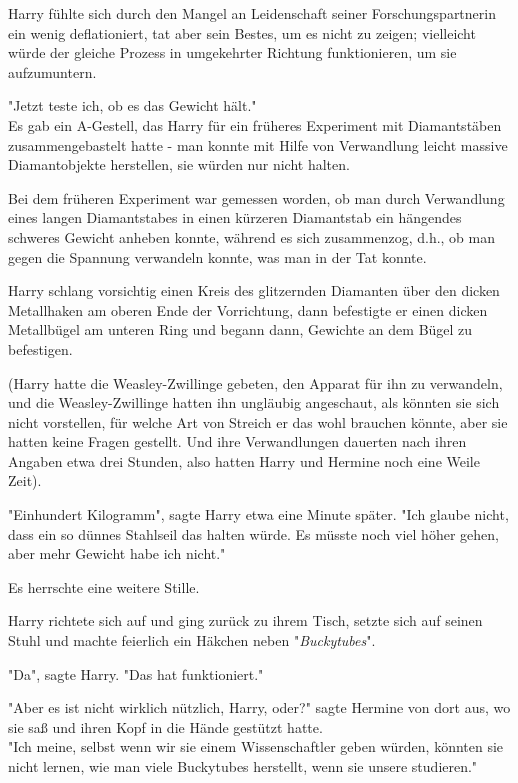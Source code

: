 {Harry fühlte sich durch den Mangel an Leidenschaft seiner Forschungspartnerin ein wenig deflationiert, tat aber sein Bestes, um es nicht zu zeigen; vielleicht würde der gleiche Prozess in umgekehrter Richtung funktionieren, um sie aufzumuntern.

"Jetzt teste ich, ob es das Gewicht hält."\\ Es gab ein A-Gestell, das Harry für ein früheres Experiment mit Diamantstäben zusammengebastelt hatte - man konnte mit Hilfe von Verwandlung leicht massive Diamantobjekte herstellen, sie würden nur nicht halten.

Bei dem früheren Experiment war gemessen worden, ob man durch Verwandlung eines langen Diamantstabes in einen kürzeren Diamantstab ein hängendes schweres Gewicht anheben konnte, während es sich zusammenzog, d.h., ob man gegen die Spannung verwandeln konnte, was man in der Tat konnte.

Harry schlang vorsichtig einen Kreis des glitzernden Diamanten über den dicken Metallhaken am oberen Ende der Vorrichtung, dann befestigte er einen dicken Metallbügel am unteren Ring und begann dann, Gewichte an dem Bügel zu befestigen.

(Harry hatte die Weasley-Zwillinge gebeten, den Apparat für ihn zu verwandeln, und die Weasley-Zwillinge hatten ihn ungläubig angeschaut, als könnten sie sich nicht vorstellen, für welche Art von Streich er das wohl brauchen könnte, aber sie hatten keine Fragen gestellt. Und ihre Verwandlungen dauerten nach ihren Angaben etwa drei Stunden, also hatten Harry und Hermine noch eine Weile Zeit).

"Einhundert Kilogramm", sagte Harry etwa eine Minute später. "Ich glaube nicht, dass ein so dünnes Stahlseil das halten würde. Es müsste noch viel höher gehen, aber mehr Gewicht habe ich nicht."

Es herrschte eine weitere Stille.

Harry richtete sich auf und ging zurück zu ihrem Tisch, setzte sich auf seinen Stuhl und machte feierlich ein Häkchen neben "\emph{Buckytubes}".

"Da", sagte Harry. "Das hat funktioniert."

"Aber es ist nicht wirklich nützlich, Harry, oder?" sagte Hermine von dort aus, wo sie saß und ihren Kopf in die Hände gestützt hatte.\\ "Ich meine, selbst wenn wir sie einem Wissenschaftler geben würden, könnten sie nicht lernen, wie man viele Buckytubes herstellt, wenn sie unsere studieren."

}
